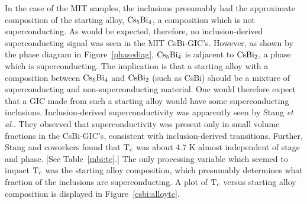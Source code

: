 	In the case of the  MIT samples, the inclusions presumably  had the
approximate  composition   of  the  starting  alloy,   $\rm  Cs_5Bi_4$,   a
composition which is not superconducting.  As would be expected, therefore,
no inclusion-derived superconducting signal was seen in the MIT CsBi-GIC's.
However,  as  shown by  the  phase diagram  in   Figure~\ref{phasediag}, $\rm
Cs_5Bi_4$ is  adjacent  to $\rm CsBi_2$, a phase  which is superconducting.
The implication is that  a starting alloy  with  a composition between $\rm
Cs_5Bi_4$   and $\rm   CsBi_2$  (such  as   CsBi) should be  a  mixture  of
superconducting  and  non-superconducting material.   One  would  therefore
expect   that  a GIC  made  from such a   starting  alloy  would  have some
superconducting   inclusions.    Inclusion-derived   superconductivity  was
apparently seen by  Stang {\em et  al.}.\cite{stang88}  They observed  that
superconductivity  was  present only   in  small  volume  fractions  in the
CsBi-GIC's, consistent with  inclusion-derived transitions.  Further, Stang
and coworkers found  that  $\rm T_c$ was  about 4.7 K almost independent of
stage and phase.  [See Table~\ref{mbi:tc}.]   The only  processing variable
which seemed to impact $\rm T_c$ was the starting alloy  composition, which
presumably determines what fraction of the inclusions  are superconducting.
A plot of $\rm T_c$  versus  starting  alloy composition  is  displayed  in
Figure~\ref{csbi:alloytc}.

